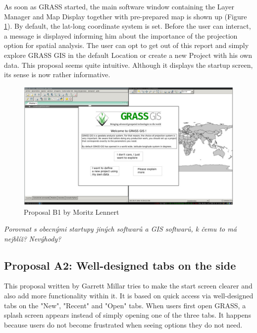 \documentclass[a4paper,10pt,twoside]{article}
\begin{document}
As soon as GRASS started, the main software window containing the Layer Manager and Map Display together with pre-prepared map is shown up (Figure \ref{fig:proposalB1}). By default, the lat-long coordinate system is set. Before the user can interact, a message is displayed informing him about the importance of the projection option for spatial analysis. The user can opt to get out of this report and simply explore GRASS GIS in the default Location or create a new Project with his own data. This proposal seems quite intuitive. Although it displays the startup screen, its sense is now rather informative.

\vspace{0.3cm}
\begin{figure}[hbt!] 
\begin{center}
\includegraphics[width=15cm]{pictures/proposalB1.png} 
\caption[Proposal B1 by Moritz Lennert]{Proposal B1 by Moritz Lennert}
\label{fig:proposalB1}
\end{center}
\end{figure}

\textit{\color{red} Porovnat s obecnými startupy jiných softwarů a GIS softwarů, k čemu to má nejblíž?}
\textit{\color{red} Nevýhody?}

\subsection{Proposal A2: Well-designed tabs on the side}

This proposal written by Garrett Millar tries to make the start screen clearer and also add more functionality within it. It is based on quick access via well-designed tabs on the "New", "Recent" and "Open" tabs. When users first open GRASS, a splash screen appears instead of simply opening one of the three tabs. It happens because users do not become frustrated when seeing options they do not need. 
\end{document}
